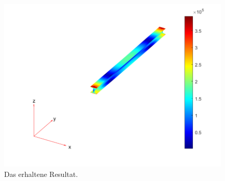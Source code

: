 %
%
%
\begin{figure}
    \centering
    \includegraphics[width=\textwidth]{papers/fem/images/balken_resultat.pdf}
    \caption{Das erhaltene Resultat.}
    \label{fem:anw:resultat}
    \end{figure}
    